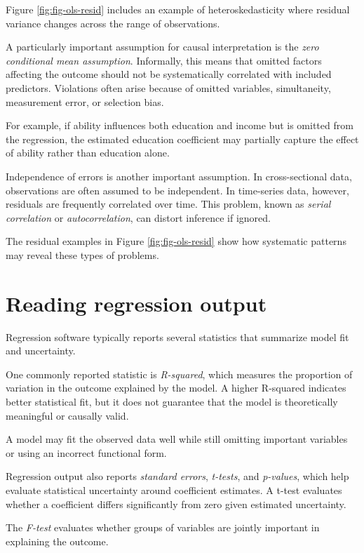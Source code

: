\documentclass[
  11pt,
  oneside]{book}
\begin{document}
Figure \ref{fig:fig-ols-resid} includes an example of heteroskedasticity where residual variance changes across the range of observations.

A particularly important assumption for causal interpretation is the \emph{zero conditional mean assumption}. Informally, this means that omitted factors affecting the outcome should not be systematically correlated with included predictors. Violations often arise because of omitted variables, simultaneity, measurement error, or selection bias.

For example, if ability influences both education and income but is omitted from the regression, the estimated education coefficient may partially capture the effect of ability rather than education alone.

Independence of errors is another important assumption. In cross-sectional data, observations are often assumed to be independent. In time-series data, however, residuals are frequently correlated over time. This problem, known as \emph{serial correlation} or \emph{autocorrelation}, can distort inference if ignored.

The residual examples in Figure \ref{fig:fig-ols-resid} show how systematic patterns may reveal these types of problems.

\section{Reading regression output}\label{reading-regression-output}

Regression software typically reports several statistics that summarize model fit and uncertainty.

One commonly reported statistic is \emph{R-squared}, which measures the proportion of variation in the outcome explained by the model. A higher R-squared indicates better statistical fit, but it does not guarantee that the model is theoretically meaningful or causally valid.

A model may fit the observed data well while still omitting important variables or using an incorrect functional form.

Regression output also reports \emph{standard errors}, \emph{t-tests}, and \emph{p-values}, which help evaluate statistical uncertainty around coefficient estimates. A t-test evaluates whether a coefficient differs significantly from zero given estimated uncertainty.

The \emph{F-test} evaluates whether groups of variables are jointly important in explaining the outcome.
\end{document}
